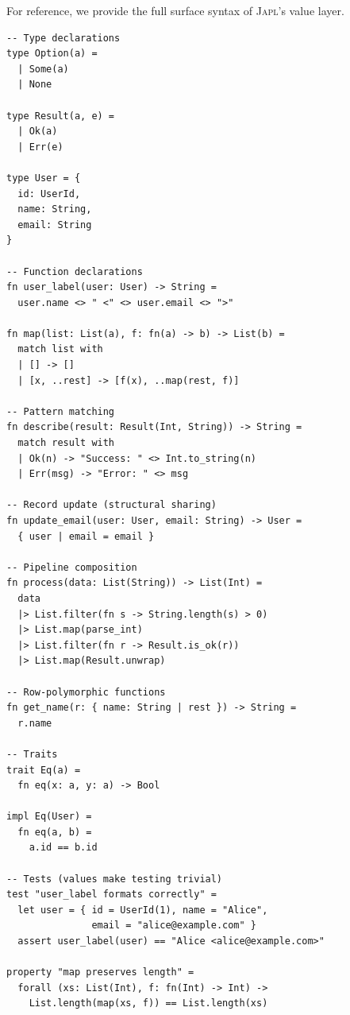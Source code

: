 \documentclass[11pt]{article}
\theoremstyle{definition}
\theoremstyle{remark}
\newcommand{\japl}{\textsc{Japl}}
\begin{document}
For reference, we provide the full surface syntax of \japl{}'s value
layer.

\begin{lstlisting}[caption={Complete value-layer syntax reference.}]
-- Type declarations
type Option(a) =
  | Some(a)
  | None

type Result(a, e) =
  | Ok(a)
  | Err(e)

type User = {
  id: UserId,
  name: String,
  email: String
}

-- Function declarations
fn user_label(user: User) -> String =
  user.name <> " <" <> user.email <> ">"

fn map(list: List(a), f: fn(a) -> b) -> List(b) =
  match list with
  | [] -> []
  | [x, ..rest] -> [f(x), ..map(rest, f)]

-- Pattern matching
fn describe(result: Result(Int, String)) -> String =
  match result with
  | Ok(n) -> "Success: " <> Int.to_string(n)
  | Err(msg) -> "Error: " <> msg

-- Record update (structural sharing)
fn update_email(user: User, email: String) -> User =
  { user | email = email }

-- Pipeline composition
fn process(data: List(String)) -> List(Int) =
  data
  |> List.filter(fn s -> String.length(s) > 0)
  |> List.map(parse_int)
  |> List.filter(fn r -> Result.is_ok(r))
  |> List.map(Result.unwrap)

-- Row-polymorphic functions
fn get_name(r: { name: String | rest }) -> String =
  r.name

-- Traits
trait Eq(a) =
  fn eq(x: a, y: a) -> Bool

impl Eq(User) =
  fn eq(a, b) =
    a.id == b.id

-- Tests (values make testing trivial)
test "user_label formats correctly" =
  let user = { id = UserId(1), name = "Alice",
               email = "alice@example.com" }
  assert user_label(user) == "Alice <alice@example.com>"

property "map preserves length" =
  forall (xs: List(Int), f: fn(Int) -> Int) ->
    List.length(map(xs, f)) == List.length(xs)
\end{lstlisting}
\end{document}
